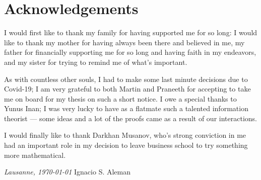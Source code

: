 \chapter*{Acknowledgements}
\vspace{0.2\textheight}

I would first like to thank my family for having supported me for so long:
I would like to thank my mother for having always been there and believed in me, 
my father for financially supporting me for so long and having faith in my endeavors, 
and my sister for trying to remind me of what's important.


As with countless other souls, I had to make some last minute decisions 
due to Covid-19; I am very grateful to both Martin and Praneeth for 
accepting to take me on board for my thesis on such a short notice. 
I owe a special thanks to Yunus Inan; I was very lucky to have as a 
flatmate such a talented information theorist --- some ideas and a lot 
of the proofs came as a result of our interactions.

I would finally like to thank Darkhan Musanov, who's strong conviction in me 
had an important role in my decision to leave business school to try something 
more mathematical. 

\bigskip
 
\noindent\textit{Lausanne, \today}
\hfill Ignacio S. Aleman
